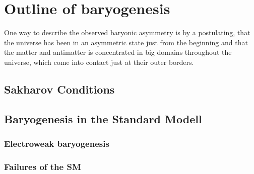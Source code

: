 \section{Outline of baryogenesis}
One way to describe the observed baryonic asymmetry is by a postulating, that the universe has been in an asymmetric state just from the beginning and that the matter and antimatter is concentrated in big domains throughout the universe, which come into contact just at their outer borders.  
\subsection{Sakharov Conditions}
\subsection{Baryogenesis in the Standard Modell}
\subsubsection{Electroweak baryogenesis}
\subsubsection{Failures of the SM}

